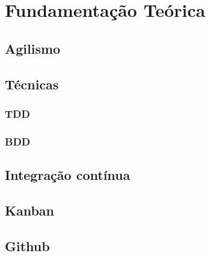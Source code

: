 \chapter{Fundamentação Teórica}

\section{Agilismo}

\section{Técnicas}

\subsection{TDD}

\subsection{BDD}

\section{Integração contínua}

\section{Kanban}

\section{Github}


